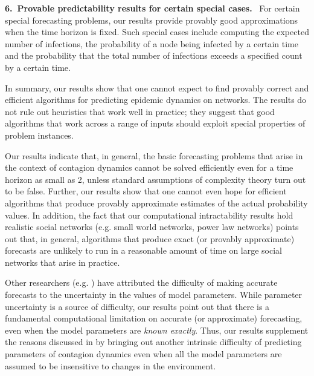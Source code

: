 \medskip
\noindent
\textbf{6.~Provable predictability results for certain special cases.} \
For certain special forecasting problems, our results provide 
provably good approximations when the time horizon is fixed.
Such special cases include computing the expected number of infections,  
the probability of a node being infected by a certain time and the
probability that the total number of infections exceeds a specified 
count by a certain time.  

\smallskip
In summary, our results show that one cannot expect to find
provably correct and efficient algorithms for predicting 
epidemic dynamics on networks.  
The results do not rule out heuristics that work well in practice;
they suggest that good algorithms that work across a range of inputs 
should exploit special properties of problem instances.

\iffalse
Our results indicate that, in general, the basic forecasting 
problems that arise in the context of contagion dynamics cannot 
be solved efficiently even for a time horizon as small as 2,
unless standard assumptions of complexity
theory turn out to be false.
Further, our results show that one cannot even hope for efficient
algorithms that produce provably approximate estimates of the 
actual probability values. 
In addition, the fact that our computational intractability results hold
realistic social networks (e.g. small world networks, power law networks)
points out that, in general, algorithms that
produce exact (or provably approximate) forecasts are unlikely to
run in a reasonable amount of time on large 
social networks that arise in practice.

\medskip
Other researchers 
(e.g. \cite{Drake-2005,Drake-2006, Martin_etal_2016,May-2006,beckage:ecosphere11})
have attributed the difficulty of making accurate 
forecasts to the uncertainty in the values of model parameters.
While parameter uncertainty is a source of difficulty,
our results point out that 
there is a fundamental computational limitation on
accurate (or approximate) forecasting, even when the 
model parameters are \emph{known exactly}. 
Thus, our results supplement the reasons discussed in 
\cite{Drake-2005,Drake-2006, Martin_etal_2016,May-2006,beckage:ecosphere11}
by bringing out another intrinsic difficulty 
of predicting parameters of contagion dynamics even when all the model
parameters are assumed to be insensitive to changes
in the environment.


